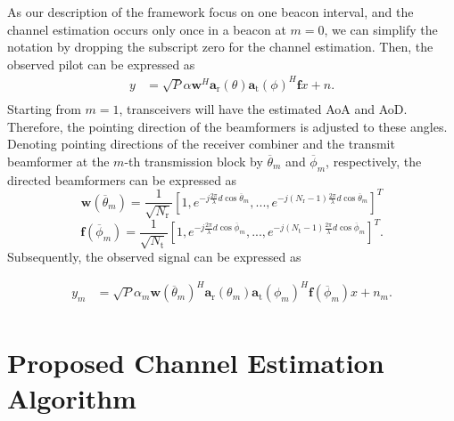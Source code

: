 \documentclass{ieeeaccess}
\begin{document}
As our description of the framework focus on one beacon interval, and the channel estimation occurs only once in a beacon at $m=0$, we can simplify the notation by dropping the subscript zero for the channel estimation. Then, the observed pilot can be expressed as
\begin{equation} \label{nn9}
\begin{split}
y &= \sqrt{P}\alpha\boldsymbol{w}^H\boldsymbol{a}_\textrm{r}(\theta)\boldsymbol{a}_\textrm{t}(\phi)^H\boldsymbol{f}x + n.\\
\end{split}
\end{equation}
Starting from $m=1$, transceivers will have the estimated AoA and AoD. Therefore, the pointing direction of the beamformers is adjusted to these angles. Denoting pointing directions of the receiver combiner and the transmit beamformer at the $m$-th transmission block by $\overline{\theta}_m$ and $\overline{\phi}_m$, respectively, the directed beamformers can be expressed as
 \begin{equation} \label{n2}
\boldsymbol{w}(\overline{\theta}_m) = \frac{1}{\sqrt{N_\textrm{r}}}[1,e^{-j\frac{2\pi}{\lambda}d\cos\overline{\theta}_m},...,e^{-j(N_\textrm{r}-1)\frac{2\pi}{\lambda}d\cos\overline{\theta}_m}]^T
\end{equation}
 \begin{equation} \label{n3}
\boldsymbol{f}(\overline{\phi}_m) = \frac{1}{\sqrt{N_\textrm{t}}}[1,e^{-j\frac{2\pi}{\lambda}d\cos\overline{\phi}_m},...,e^{-j(N_\textrm{t}-1)\frac{2\pi}{\lambda}d\cos\overline{\phi}_m}]^T.
\end{equation}
Subsequently, the observed signal can be expressed as

\begin{equation} \label{nn10}
\begin{split}
y_m &= \sqrt{P}\alpha_m\boldsymbol{w}(\overline{\theta}_m)^H\boldsymbol{a}_\textrm{r}(\theta_m)\boldsymbol{a}_\textrm{t}(\phi_m)^H\boldsymbol{f}(\overline{\phi}_m)x + n_m.\\
\end{split}
\end{equation}







\section{Proposed Channel Estimation Algorithm}\label{Initial channel estimation}
\end{document}
